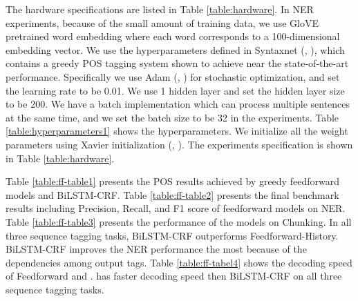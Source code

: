 The hardware specifications are listed in Table \ref{table:hardware}. In NER experiments, because of the small amount of training data, we use GloVE pretrained word embedding where each word corresponds to a 100-dimensional embedding vector. We use the hyperparameters defined in Syntaxnet (\citeauthor{alberti2017syntaxnet}, \citeyear{alberti2017syntaxnet}), which contains a greedy POS tagging system shown to achieve near the state-of-the-art performance. Specifically we use Adam (\citeauthor{kingma2014adam}, \citeyear{kingma2014adam}) for stochastic optimization, and set the learning rate to be 0.01. We use 1 hidden layer and set the hidden layer size to be 200. We have a batch implementation which can process multiple sentences at the same time, and we set the batch size to be 32 in the experiments. Table \ref{table:hyperparameters1} shows the hyperparameters. We initialize all the weight parameters using Xavier initialization (\citeauthor{glorot2011domain}, \citeyear{glorot2011domain}). The experiments specification is shown in Table \ref{table:hardware}.


Table \ref{table:ff-table1} presents the POS results achieved by greedy feedforward models and BiLSTM-CRF. Table \ref{table:ff-table2} presents the final benchmark results including Precision, Recall, and F1 score of feedforward models on NER. Table \ref{table:ff-table3} presents the performance of the models on Chunking. In all three sequence tagging tasks, BiLSTM-CRF outperforms Feedforward-History. BiLSTM-CRF improves the NER performance the most because of the dependencies among output tags. Table \ref{table:ff-tabel4} shows the decoding speed of Feedforward and \ffa. \ffa{} has faster decoding speed then BiLSTM-CRF on all three sequence tagging tasks.



